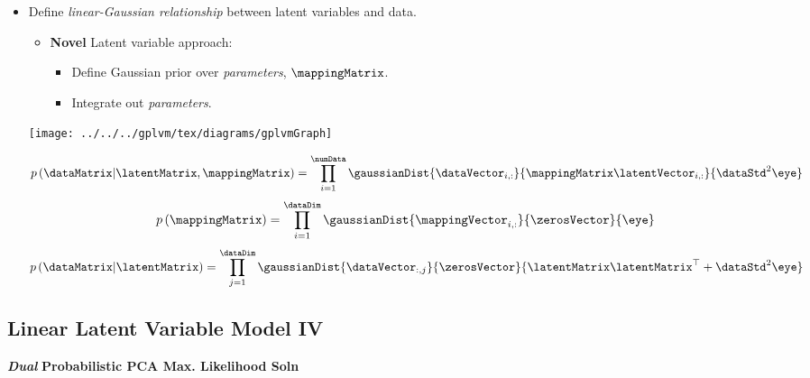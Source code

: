 \begin{itemize}
\item Define \emph{linear-Gaussian relationship} between latent variables
and data.

\begin{itemize}
\item \textbf{Novel} Latent variable approach:

\begin{itemize}
\item Define Gaussian prior over \emph{parameters}, $\mappingMatrix$.
\item Integrate out \emph{parameters}.
\end{itemize}
\end{itemize}

\begin{center}
\texttt{[image: ../../../gplvm/tex/diagrams/gplvmGraph]}
\par\end{center}

\begin{center}
\[
p\left(\dataMatrix|\latentMatrix,\mappingMatrix\right)=\prod_{i=1}^{\numData}\gaussianDist{\dataVector_{i,:}}{\mappingMatrix\latentVector_{i,:}}{\dataStd^{2}\eye}\]
\[
p\left(\mappingMatrix\right)=\prod_{i=1}^{\dataDim}\gaussianDist{\mappingVector_{i,:}}{\zerosVector}{\eye}\]
\[
p\left(\dataMatrix|\latentMatrix\right)=\prod_{j=1}^{\dataDim}\gaussianDist{\dataVector_{:,j}}{\zerosVector}{\latentMatrix\latentMatrix^{\top}+\dataStd^{2}\eye}\]

\par\end{center}

\end{itemize}

\subsection{Linear Latent Variable Model IV}

\textbf{\emph{Dual}} \textbf{Probabilistic PCA Max. Likelihood Soln}
\cite{Lawrence:gplvm03}


